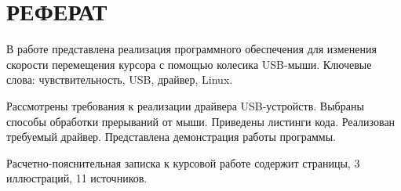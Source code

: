 \chapter*{РЕФЕРАТ}

\setcounter{page}{3}

В работе представлена реализация программного обеспечения для изменения скорости перемещения курсора с помощью колесика USB-мыши.
Ключевые слова: чувствительность, USB, драйвер, Linux.

Рассмотрены требования к реализации драйвера USB-устройств. Выбраны способы обработки прерываний от мыши. Приведены листинги кода. Реализован требуемый драйвер. Представлена демонстрация работы
программы.

Расчетно-пояснительная записка к курсовой работе содержит \pageref{LastPage} страницы, 3 иллюстраций, 11 источников.




